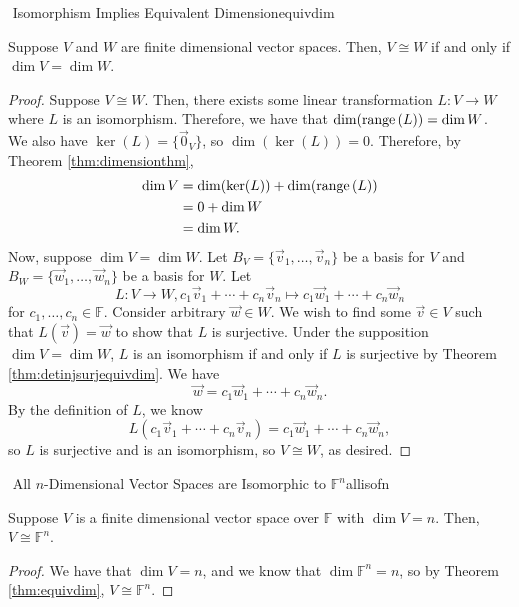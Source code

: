         \begin{theorem}{\Stop\,\,Isomorphism Implies Equivalent Dimension}{equivdim}

            Suppose \(V\) and \(W\) are finite dimensional vector spaces. Then, \(V\cong W\) if and only if \(\dim V=\dim W\).
            \begin{proof}
                Suppose \(V\cong W\). Then, there exists some linear transformation \(L:V\to W\) where \(L\) is an isomorphism. Therefore, we have that \(\dim(\text{range\,}(L))=\dim W\). We also have \(\ker(L)=\{\vec{0}_V\}\), so \(\dim(\ker(L))=0\). Therefore, by Theorem \ref{thm:dimensionthm},
                \begin{align*}
                    \dim V&=\dim(\ker(L))+\dim(\text{range\,}(L)) \\
                    &=0+\dim W \\
                    &=\dim W.
                \end{align*}
                Now, suppose \(\dim V=\dim W\). Let \(B_V=\{\vec{v}_1,\ldots,\vec{v}_n\}\) be a basis for \(V\) and \(B_W=\{\vec{w}_1,\ldots,\vec{w}_n\}\) be a basis for \(W\). Let 
                \begin{equation*}
                    L:V\to W, c_1\vec{v}_1+\cdots+c_n\vec{v}_n\mapsto c_1\vec{w}_1+\cdots+c_n\vec{w}_n
                \end{equation*}
                for \(c_1,\ldots,c_n\in\mathbb{F}\). Consider arbitrary \(\vec{w}\in W\). We wish to find some \(\vec{v}\in V\) such that \(L(\vec{v})=\vec{w}\) to show that \(L\) is surjective. Under the supposition \(\dim V=\dim W\), \(L\) is an isomorphism if and only if \(L\) is surjective by Theorem \ref{thm:detinjsurjequivdim}. We have
                \begin{equation*}
                    \vec{w}=c_1\vec{w}_1+\cdots+c_n\vec{w}_n.
                \end{equation*}
                By the definition of \(L\), we know
                \begin{equation*}
                    L(c_1\vec{v}_1+\cdots+c_n\vec{v}_n)=c_1\vec{w}_1+\cdots+c_n\vec{w}_n,
                \end{equation*}
                so \(L\) is surjective and is an isomorphism, so \(V\cong W\), as desired.
            \end{proof}
            
        \end{theorem}
        \begin{theorem}{\Stop\,\,All \(n\)-Dimensional Vector Spaces are Isomorphic to \(\mathbb{F}^n\)}{allisofn}
            
            Suppose \(V\) is a finite dimensional vector space over \(\mathbb{F}\) with \(\dim V=n\). Then, \(V\cong \mathbb{F}^n\).
            \begin{proof}
                We have that \(\dim V=n\), and we know that \(\dim\mathbb{F}^n=n\), so by Theorem \ref{thm:equivdim}, \(V\cong\mathbb{F}^n\).
            \end{proof}

        \end{theorem}

